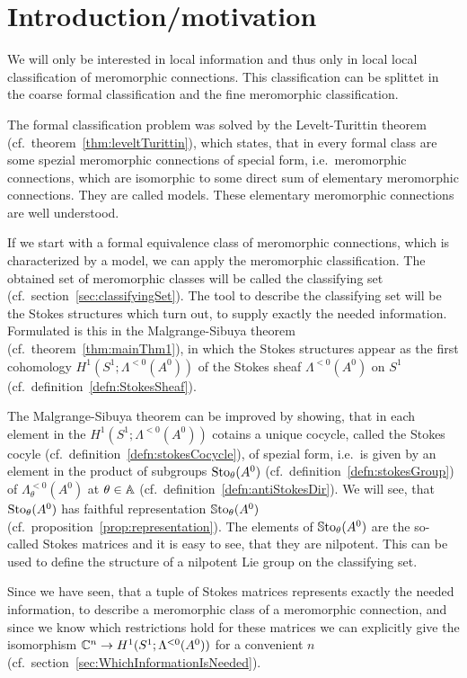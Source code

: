 \chapter{Introduction/motivation}

We will only be interested in local information and thus only in local local
classification of meromorphic connections.
This classification can be splittet in the coarse formal classification and the
fine meromorphic classification.

The formal classification problem was solved by the Levelt-Turittin theorem
(cf.\ theorem~\ref{thm:leveltTurittin}), which states, that in every formal
class are some spezial meromorphic connections of special form, i.e.\
meromorphic connections, which are isomorphic to some direct sum of elementary
meromorphic connections. They are called models.
These elementary meromorphic connections are well understood.

If we start with a formal equivalence class of meromorphic connections, which
is characterized by a model, we can apply the meromorphic classification.
The obtained set of meromorphic classes will be called the classifying set
(cf.\ section~\ref{sec:classifyingSet}).
The tool to describe the classifying set will be the Stokes structures which
turn out, to supply exactly the needed information.
Formulated is this in the Malgrange-Sibuya theorem
(cf.\ theorem~\ref{thm:mainThm1}), in which the Stokes structures appear as the
first cohomology $H^1(S^1;\Lambda^{<0}(A^0))$ of the Stokes sheaf
$\Lambda^{<0}(A^0)$ on $S^1$ (cf.\ definition~\ref{defn:StokesSheaf}).

The Malgrange-Sibuya theorem can be improved by showing, that in each element
in the $H^1(S^1;\Lambda^{<0}(A^0))$ cotains a unique cocycle, called the Stokes
cocyle (cf.\ definition~\ref{defn:stokesCocycle}), of spezial form, i.e.\ is
given by an element in the product of subgroups $\operatorname{Sto}_\theta(A^0)$
(cf.\ definition~\ref{defn:stokesGroup}) of $\Lambda_\theta^{<0}(A^0)$ at
\rewrite{spezial directions} $\theta\in\mathbb{A}$
(cf.\ definition~\ref{defn:antiStokesDir}).
We will see, that $\operatorname{Sto}_\theta(A^0)$ has faithful representation
$\operatorname{\mathbb{S}to}_\theta(A^0)$ (cf.\ proposition~\ref{prop:representation}).
The elements of $\operatorname{\mathbb{S}to}_\theta(A^0)$ are the so-called Stokes matrices and it is
easy to see, that they are nilpotent.
This can be used to define the structure of a nilpotent Lie group on the
classifying set.

Since we have seen, that a tuple of Stokes matrices represents exactly the
needed information, to describe a meromorphic class of a meromorphic
connection, and since we know which restrictions hold for these matrices we can
explicitly give the isomorphism $\mathbb{C}^n\to H^1(S^1;\Lambda^{<0}(A^0))$ for a
convenient $n$ (cf.\ section~\ref{sec:WhichInformationIsNeeded}).

\begin{comment}
  \begin{enumerate}
    \item first introduce asymptotic analysis
    \item then define languages for meromorphic connections or systems
    \item talk about Stokes structures
    \item more?
  \end{enumerate}
\end{comment}

